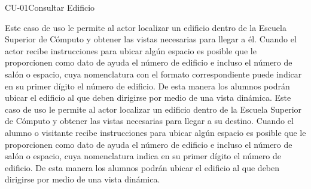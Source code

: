 \begin{UseCase}{CU-01}{Consultar Edificio}
    {
	Este caso de uso le permite al actor localizar un edificio dentro de la Escuela Superior de Cómputo y obtener las vistas necesarias para llegar a él. 
	Cuando el actor recibe instrucciones para ubicar algún espacio es posible que le proporcionen como dato de ayuda el número de edificio e incluso el número de salón o espacio, cuya nomenclatura con el formato correspondiente puede indicar en su primer dígito el número de edificio. De esta manera los alumnos podrán ubicar el edificio al que deben dirigirse por medio de una vista dinámica. 
	Este caso de uso le permite al actor localizar un edificio dentro de la Escuela Superior de Cómputo y obtener las vistas necesarias para llegar a su destino. 
	Cuando el alumno o visitante recibe instrucciones para ubicar algún espacio es posible que le proporcionen como dato de ayuda el número de edificio e incluso el número de salón o espacio, cuya nomenclatura indica en su primer dígito el número de edificio. De esta manera los alumnos podrán ubicar el edificio al que deben dirigirse por medio de una vista dinámica. 

	
    }


%			


\end{UseCase}
